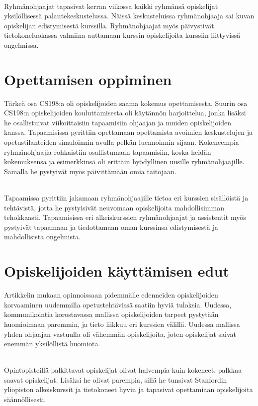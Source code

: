 \documentclass[finnish]{tktltiki2}
\theoremstyle{definition}
\theoremstyle{remark}
\begin{document}
\\

Ryhmänohjaajat tapasivat kerran viikossa kaikki ryhmänsä opiskelijat yksilöllisessä palautekeskustelussa. Näissä keskusteluissa ryhmänohjaaja sai kuvan opiskelijan edistymisestä kurssilla. Ryhmänohjaajat myös päivystivät tietokoneluokassa valmiina auttamaan kurssin opiskelijoita kurssiin liittyvissä ongelmissa.





\section{Opettamisen oppiminen}

Tärkeä osa CS198:a oli opiskelijoiden saama kokemus opettamisesta. Suurin osa CS198:n opiskelijoiden kouluttamisesta oli käytännön harjoittelua, jonka lisäksi he osallistuivat viikoittaisiin tapaamisiin ohjaajan ja muiden opiskelijoiden kanssa. Tapaamisissa pyrittiin opettamaan opettamista avoimien keskustelujen ja opetustilanteiden simuloinnin avulla pelkän luennoinnin sijaan. Kokeneempia ryhmänohjaajia rohkaistiin osallistumaan tapaamisiin, koska heidän kokemuksensa ja esimerkkinsä oli erittäin hyödyllinen uusille ryhmänohjaajille. Samalla he pystyivät myös päivittämään omia taitojaan. 

\\

Tapaamissa pyrittiin jakamaan ryhmänohjaajille tietoa eri kurssien si\-säl\-löis\-tä ja tehtävistä, jotta he pystyisivät neuvomaan opiskelijoita mahdollisimman tehokkaasti. Tapaamisissa eri alkeiskurssien ryhmänohjaajat ja assistentit myös pystyivät tapaamaan ja tiedottamaan oman kurssinsa edistymisestä ja mahdollisista ongelmista.


\section{Opiskelijoiden käyttämisen edut}

Artikkelin mukaan opinnoissaan pidemmälle edenneiden opiskelijoiden korvaaminen uudemmilla opetustehtävissä saatiin hyviä tuloksia. Uudessa, kommunikointia korostavassa mallissa opiskelijoiden tarpeet pystytään huomioimaan paremmin, ja tieto liikkuu eri kurssien välillä. Uudessa mallissa yhden ohjaajan vastuulla oli vähemmän opiskelijoita, joten opiskelijat saivat enemmän yksilöllistä huomiota.

\\

Opintopisteillä palkittavat opiskelijat olivat halvempia kuin kokeneet, palkkaa saavat opiskelijat. Lisäksi he olivat parempia, sillä he tunsivat Stanfordin yliopiston alkeiskurssit ja tietokoneet hyvin ja tapasivat opettamiaan opiskelijoita säännöllisesti.






\end{document}

